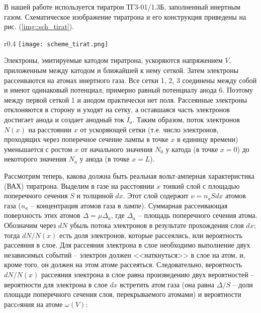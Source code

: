 В нашей работе используется тиратрон ТГ3-01/1.3Б, заполненный инертным газом.
Схематическое изображение тиратрона и его конструкция приведены на рис.
(\ref{img::sch_tirat}).

\begin{wrapfigure}{r}{0.4\textwidth}
  \centering
  \texttt{[image: scheme\_tirat.png]}
  \caption{{Схема тиратрона (слева) и его конструкция (справа): \\
  1, 2, 3 --- сетки, 4 --- внешний металлический цилиндр, 5 --- катод, \\ 6 ---
  анод, 7 --- накаливаемая спираль}}
  \label{img::sch_tirat}
\end{wrapfigure}
Электроны, эмитируемые катодом тиратрона, ускоряются напряжением $V$,
приложенным между катодом и ближайшей к нему сеткой. Затем электроны
рассеиваются на атомах инертного газа. Все сетки 1, 2, 3 соединены между собой и
имеют одинаковый потенциал, примерно равный потенциалу анода 6. Поэтому между
первой сеткой 1 и анодом практически нет поля. Рассеянные электроны отклоняются
в сторону и уходят на сетку, а оставшаяся часть электронов достигает анода и
создает анодный ток $I_a$. Таким образом, поток электронов $N(x)$ на расстоянии
$x$ от ускоряющей сетки (т.е. число электронов, проходящих через поперечное
сечение лампы в точке $x$ в единицу времени) уменьшается с ростом $x$ от
начального значения $N_0$ у катода (в точке $x = 0$) до некоторого значения
$N_a$ у анода (в точке $x = L$).

Рассмотрим теперь, какова должна быть реальная вольт-амперная характеристика
(ВАХ) тиратрона. Выделим в газе на расстоянии $x$ тонкий слой с площадью
поперечного сечения $S$ и толщиной $dx$. Этот слой содержит $\nu = n_a S dx$
атомов газа ($n_a$ -- концентрация атомов газа в лампе). Суммарная рассеивающая
поверхность этих атомов $\Delta = \mu \Delta_a$, где $\Delta_a$ -- площадь
поперечного сечения атома. Обозначим через $dN$ убыль потока электронов в
результате прохождения слоя $dx$; тогда $dN/N(x)$ есть доля электронов, которые
рассеялись, или вероятность рассеяния в слое. Для рассеяния электрона в слое
необходимо выполнение двух независимых событий -- электрон должен <<наткнуться>>
в слое на атом, и, кроме того, он должен на этом атоме рассеяться.
Следовательно, вероятность $dN/N(x)$ рассеяния электрона в слое равна
произведению двух вероятностей -- вероятности для электрона в слое $dx$
встретить атом газа (она равна $\Delta / S$ -- доли площади поперечного сечения
слоя, перекрываемого атомами) и вероятности рассeяния на атоме $\omega(V)$:

